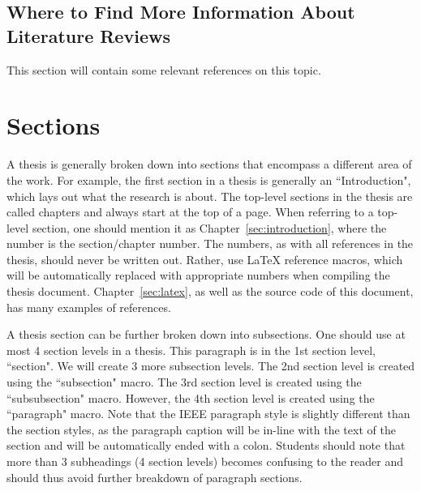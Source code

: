 
\subsection{Where to Find More Information About Literature Reviews}\label{sec:literature_review:more_info}

This section will contain some relevant references on this topic.

\section{Sections}\label{sec:sections}
A thesis is generally broken down into sections that encompass a different area of the work. For example, the first section in a thesis is generally an ``Introduction", which lays out what the research is about. The top-level sections in the thesis are called chapters and always start at the top of a page. When referring to a top-level section, one should mention it as Chapter~\ref{sec:introduction}, where the number is the section/chapter number. The numbers, as with all references in the thesis, should never be written out. Rather, use LaTeX reference macros, which will be automatically replaced with appropriate numbers when compiling the thesis document. Chapter~\ref{sec:latex}, as well as the source code of this document, has many examples of references.

A thesis section can be further broken down into subsections. One should use at most 4 section levels in a thesis. This paragraph is in the 1st section level, ``section". We will create 3 more subsection levels. The 2nd section level is created using the ``subsection" macro. The 3rd section level is created using the ``subsubsection" macro. However, the 4th section level is created using the ``paragraph" macro. Note that the IEEE paragraph style is slightly different than the section styles, as the paragraph caption will be in-line with the text of the section and will be automatically ended with a colon. Students should note that more than 3 subheadings (4 section levels) becomes confusing to the reader and should thus avoid further breakdown of paragraph sections.

